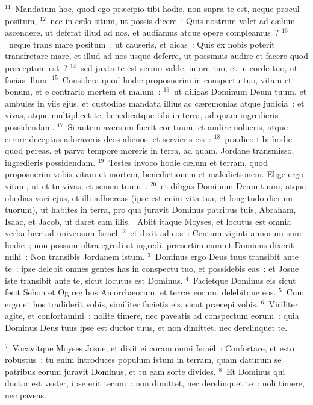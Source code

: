 ${}^{11}$~Mandatum hoc, quod ego pr\ae cipio tibi hodie, non supra te est, neque procul positum,
${}^{12}$~nec in c\ae lo situm, ut possis dicere~: Quis nostrum valet ad c\ae lum ascendere, ut deferat illud ad nos, et audiamus atque opere compleamus~?
${}^{13}$~neque trans mare positum~: ut causeris, et dicas~: Quis ex nobis poterit transfretare mare, et illud ad nos usque deferre, ut possimus audire et facere quod pr\ae ceptum est~?
${}^{14}$~sed juxta te est sermo valde, in ore tuo, et in corde tuo, ut facias illum.
${}^{15}$~Considera quod hodie proposuerim in conspectu tuo, vitam et bonum, et e contrario mortem et malum~:
${}^{16}$~ut diligas Dominum Deum tuum, et ambules in viis ejus, et custodias mandata illius ac c\ae remonias atque judicia~: et vivas, atque multiplicet te, benedicatque tibi in terra, ad quam ingredieris possidendam.
${}^{17}$~Si autem aversum fuerit cor tuum, et audire nolueris, atque errore deceptus adoraveris deos alienos, et servieris eis~:
${}^{18}$~pr\ae dico tibi hodie quod pereas, et parvo tempore moreris in terra, ad quam, Jordane transmisso, ingredieris possidendam.
${}^{19}$~Testes invoco hodie c\ae lum et terram, quod proposuerim vobis vitam et mortem, benedictionem et maledictionem. Elige ergo vitam, ut et tu vivas, et semen tuum~:
${}^{20}$~et diligas Dominum Deum tuum, atque obedias voci ejus, et illi adh\ae reas (ipse est enim vita tua, et longitudo dierum tuorum), ut habites in terra, pro qua juravit Dominus patribus tuis, Abraham, Isaac, et Jacob, ut daret eam illis.
~Abiit itaque Moyses, et locutus est omnia verba h\ae c ad universum Isra\"el,
${}^{2}$~et dixit ad eos~: Centum viginti annorum sum hodie~; non possum ultra egredi et ingredi, pr\ae sertim cum et Dominus dixerit mihi~: Non transibis Jordanem istum.
${}^{3}$~Dominus ergo Deus tuus transibit ante te~: ipse delebit omnes gentes has in conspectu tuo, et possidebis eas~: et Josue iste transibit ante te, sicut locutus est Dominus.
${}^{4}$~Facietque Dominus eis sicut fecit Sehon et Og regibus Amorrh\ae orum, et terr\ae\ eorum, delebitque eos.
${}^{5}$~Cum ergo et hos tradiderit vobis, similiter facietis eis, sicut pr\ae cepi vobis.
${}^{6}$~Viriliter agite, et confortamini~: nolite timere, nec paveatis ad conspectum eorum~: quia Dominus Deus tuus ipse est ductor tuus, et non dimittet, nec derelinquet te.


${}^{7}$~Vocavitque Moyses Josue, et dixit ei coram omni Isra\"el~: Confortare, et esto robustus~: tu enim introduces populum istum in terram, quam daturum se patribus eorum juravit Dominus, et tu eam sorte divides.
${}^{8}$~Et Dominus qui ductor est vester, ipse erit tecum~: non dimittet, nec derelinquet te~: noli timere, nec paveas.


